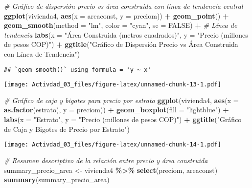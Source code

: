 \documentclass[
]{article}
\newenvironment{Shaded}{\begin{snugshade}}{\end{snugshade}}
\newcommand{\AttributeTok}[1]{\textcolor[rgb]{0.13,0.29,0.53}{#1}}
\newcommand{\CommentTok}[1]{\textcolor[rgb]{0.56,0.35,0.01}{\textit{#1}}}
\newcommand{\ConstantTok}[1]{\textcolor[rgb]{0.56,0.35,0.01}{#1}}
\newcommand{\FunctionTok}[1]{\textcolor[rgb]{0.13,0.29,0.53}{\textbf{#1}}}
\newcommand{\NormalTok}[1]{#1}
\newcommand{\OtherTok}[1]{\textcolor[rgb]{0.56,0.35,0.01}{#1}}
\newcommand{\SpecialCharTok}[1]{\textcolor[rgb]{0.81,0.36,0.00}{\textbf{#1}}}
\newcommand{\StringTok}[1]{\textcolor[rgb]{0.31,0.60,0.02}{#1}}
\begin{document}
\begin{Shaded}
\begin{Highlighting}[]
\CommentTok{\# Gráfico de dispersión precio vs área construida con línea de tendencia central}
\FunctionTok{ggplot}\NormalTok{(vivienda4, }\FunctionTok{aes}\NormalTok{(}\AttributeTok{x =}\NormalTok{ areaconst, }\AttributeTok{y =}\NormalTok{ preciom)) }\SpecialCharTok{+}
  \FunctionTok{geom\_point}\NormalTok{() }\SpecialCharTok{+}
  \FunctionTok{geom\_smooth}\NormalTok{(}\AttributeTok{method =} \StringTok{"lm"}\NormalTok{, }\AttributeTok{color =} \StringTok{"cyan"}\NormalTok{, }\AttributeTok{se =} \ConstantTok{FALSE}\NormalTok{) }\SpecialCharTok{+}  \CommentTok{\# Línea de tendencia}
  \FunctionTok{labs}\NormalTok{(}\AttributeTok{x =} \StringTok{"Área Construida (metros cuadrados)"}\NormalTok{, }\AttributeTok{y =} \StringTok{"Precio (millones de pesos COP)"}\NormalTok{) }\SpecialCharTok{+}
  \FunctionTok{ggtitle}\NormalTok{(}\StringTok{"Gráfico de Dispersión Precio vs Área Construida con Línea de Tendencia"}\NormalTok{)}
\end{Highlighting}
\end{Shaded}

\begin{verbatim}
## `geom_smooth()` using formula = 'y ~ x'
\end{verbatim}

\texttt{[image: Activdad\_03\_files/figure-latex/unnamed-chunk-13-1.pdf]}

\begin{Shaded}
\begin{Highlighting}[]
\CommentTok{\# Gráfico de caja y bigotes para precio por estrato}
\FunctionTok{ggplot}\NormalTok{(vivienda4, }\FunctionTok{aes}\NormalTok{(}\AttributeTok{x =} \FunctionTok{as.factor}\NormalTok{(estrato), }\AttributeTok{y =}\NormalTok{ preciom)) }\SpecialCharTok{+}
  \FunctionTok{geom\_boxplot}\NormalTok{(}\AttributeTok{fill =} \StringTok{"lightblue"}\NormalTok{) }\SpecialCharTok{+}
  \FunctionTok{labs}\NormalTok{(}\AttributeTok{x =} \StringTok{"Estrato"}\NormalTok{, }\AttributeTok{y =} \StringTok{"Precio (millones de pesos COP)"}\NormalTok{) }\SpecialCharTok{+}
  \FunctionTok{ggtitle}\NormalTok{(}\StringTok{"Gráfico de Caja y Bigotes de Precio por Estrato"}\NormalTok{)}
\end{Highlighting}
\end{Shaded}

\texttt{[image: Activdad\_03\_files/figure-latex/unnamed-chunk-14-1.pdf]}

\begin{Shaded}
\begin{Highlighting}[]
\CommentTok{\# Resumen descriptivo de la relación entre precio y área construida}
\NormalTok{summary\_precio\_area }\OtherTok{\textless{}{-}}\NormalTok{ vivienda4 }\SpecialCharTok{\%\textgreater{}\%}
  \FunctionTok{select}\NormalTok{(preciom, areaconst)}
\FunctionTok{summary}\NormalTok{(summary\_precio\_area)}
\end{Highlighting}
\end{Shaded}
\end{document}
